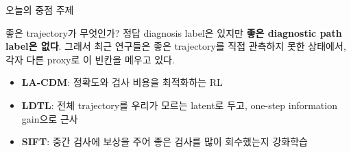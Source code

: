 \documentclass[
11pt,notheorems,hyperref={pdfauthor=whatever}
]{beamer}
\begin{document}
\begin{frame}{오늘의 중점 주제}
\vspace{0.55em}
\begin{block}{좋은 trajectory가 무엇인가?}
\small
정답 diagnosis label은 있지만 \textbf{좋은 diagnostic path label은 없다}. 그래서 최근 연구들은 좋은 trajectory를 직접 관측하지 못한 상태에서, 각자 다른 proxy로 이 빈칸을 메우고 있다.
\end{block}

\vspace{0.75em}
\begin{itemize}
\small
  \item \textbf{LA-CDM}: 정확도와 검사 비용을 최적화하는 RL
  \item \textbf{LDTL}: 전체 trajectory를 우리가 모르는 latent로 두고, one-step information gain으로 근사
  \item \textbf{SIFT}: 중간 검사에 보상을 주어 좋은 검사를 많이 회수했는지 강화학습
\end{itemize}
\end{frame}
\end{document}
